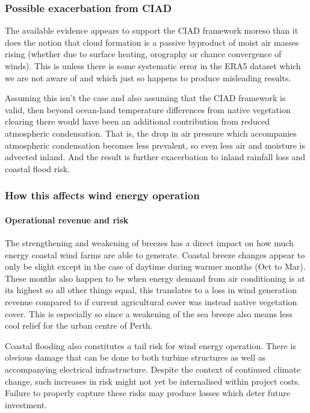 \subsubsection{Possible exacerbation from CIAD}

The available evidence appears to support the \ac{CIAD} framework moreso than it does the notion that cloud formation is a passive byproduct of moist air masses rising (whether due to surface heating, orography or chance convergence of winds). This is unless there is some systematic error in the \ac{ERA5} dataset which we are not aware of and which just so happens to produce misleading results.

Assuming this isn't the case and also assuming that the \ac{CIAD} framework is valid, then beyond ocean-land temperature differences from native vegetation clearing there would have been an additional contribution from reduced atmospheric condensation. That is, the drop in air pressure which accompanies atmospheric condensation becomes less prevalent, so even less air and moisture is advected inland. And the result is further exacerbation to inland rainfall loss and coastal flood risk.

\subsubsection{How this affects wind energy operation}

\paragraph{Operational revenue and risk}

The strengthening and weakening of breezes has a direct impact on how much energy coastal wind farms are able to generate. Coastal breeze changes appear to only be slight except in the case of daytime during warmer months (Oct to Mar). These months also happen to be when energy demand from air conditioning is at its highest so all other things equal, this translates to a loss in wind generation revenue compared to if current agricultural cover was instead native vegetation cover. This is especially so since a weakening of the sea breeze also means less cool relief for the urban centre of Perth.

Coastal flooding also constitutes a tail risk for wind energy operation. There is obvious damage that can be done to both turbine structures as well as accompanying electrical infrastructure. Despite the context of continued climate change, such increases in risk might not yet be internalised within project costs. Failure to properly capture these risks may produce losses which deter future investment.


